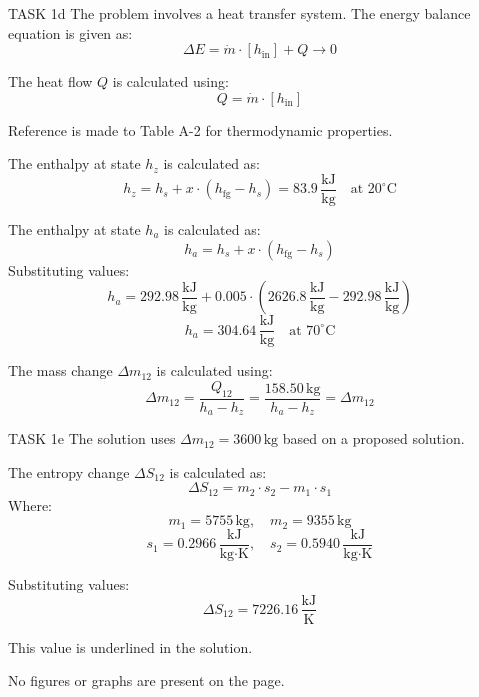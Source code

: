 TASK 1d  
The problem involves a heat transfer system. The energy balance equation is given as:  
\[
\Delta E = \dot{m} \cdot [h_{\text{in}}] + Q \rightarrow 0
\]  

The heat flow \( Q \) is calculated using:  
\[
Q = \dot{m} \cdot [h_{\text{in}}]
\]  

Reference is made to Table A-2 for thermodynamic properties.  

The enthalpy at state \( h_z \) is calculated as:  
\[
h_z = h_s + x \cdot (h_{\text{fg}} - h_s) = 83.9 \, \frac{\text{kJ}}{\text{kg}} \quad \text{at } 20^\circ\text{C}
\]  

The enthalpy at state \( h_a \) is calculated as:  
\[
h_a = h_s + x \cdot (h_{\text{fg}} - h_s)
\]  
Substituting values:  
\[
h_a = 292.98 \, \frac{\text{kJ}}{\text{kg}} + 0.005 \cdot (2626.8 \, \frac{\text{kJ}}{\text{kg}} - 292.98 \, \frac{\text{kJ}}{\text{kg}})
\]  
\[
h_a = 304.64 \, \frac{\text{kJ}}{\text{kg}} \quad \text{at } 70^\circ\text{C}
\]  

The mass change \( \Delta m_{12} \) is calculated using:  
\[
\Delta m_{12} = \frac{Q_{12}}{h_a - h_z} = \frac{158.50 \, \text{kg}}{h_a - h_z} = \Delta m_{12}
\]  

TASK 1e  
The solution uses \( \Delta m_{12} = 3600 \, \text{kg} \) based on a proposed solution.  

The entropy change \( \Delta S_{12} \) is calculated as:  
\[
\Delta S_{12} = m_2 \cdot s_2 - m_1 \cdot s_1
\]  
Where:  
\[
m_1 = 5755 \, \text{kg}, \quad m_2 = 9355 \, \text{kg}
\]  
\[
s_1 = 0.2966 \, \frac{\text{kJ}}{\text{kg·K}}, \quad s_2 = 0.5940 \, \frac{\text{kJ}}{\text{kg·K}}
\]  

Substituting values:  
\[
\Delta S_{12} = 7226.16 \, \frac{\text{kJ}}{\text{K}}
\]  

This value is underlined in the solution.  

No figures or graphs are present on the page.